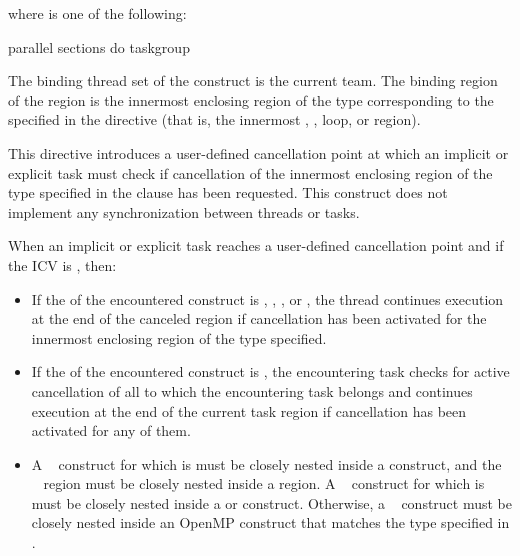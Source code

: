 {{{{where  is one of the following:

\begin{indentedcodelist}
parallel
sections
do
taskgroup
\end{indentedcodelist}
\fortranspecificend

\binding
The binding thread set of the  construct is the current team.
The binding region of the  region is the innermost enclosing region of the type corresponding to the  
specified in the directive (that is, the innermost , , loop, or 
 region).

\descr
This directive introduces a user-defined cancellation point at which an implicit or 
explicit task must check if cancellation of the innermost enclosing region of the type 
specified in the clause has been requested. This construct does not implement any 
synchronization between threads or tasks.

When an implicit or explicit task reaches a user-defined cancellation point and if 
the  ICV is , then:
\begin{itemize}
\item If the  of the encountered  construct is , , , or ,
the thread continues execution at the end of the canceled region if 
cancellation has been activated for the innermost enclosing region of 
the type specified.

\item If the  of the encountered 
 construct is , the encountering 
task checks for active cancellation of all   to which the 
encountering task belongs and continues execution at the end of the current 
task region if cancellation has been activated for any of them.
\end{itemize}

\restrictions
\begin{itemize}
\item A ~ construct for which
 is  must be closely nested
inside a  construct, and the ~
region must be closely nested inside a  region. A
~ construct for which
 is  must be closely nested
inside a  or  construct. Otherwise, a
~ construct must be closely nested inside
an OpenMP construct that matches the type specified in
.
\end{itemize}

}}}}
